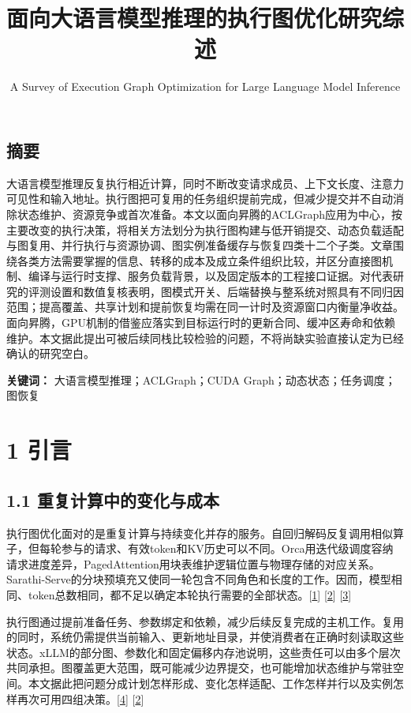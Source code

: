 \documentclass[
  11pt,
  UTF8]{ctexart}
\title{面向大语言模型推理的执行图优化研究综述}
\subtitle{A Survey of Execution Graph Optimization for Large Language
Model Inference}
\author{}
\date{}
\begin{document}
\maketitle

\hypertarget{abstract}{%
\subsection*{摘要}\label{abstract}}

大语言模型推理反复执行相近计算，同时不断改变请求成员、上下文长度、注意力可见性和输入地址。执行图把可复用的任务组织提前完成，但减少提交并不自动消除状态维护、资源竞争或首次准备。本文以面向昇腾的ACLGraph应用为中心，按主要改变的执行决策，将相关方法划分为执行图构建与低开销提交、动态负载适配与图复用、并行执行与资源协调、图实例准备缓存与恢复四类十二个子类。文章围绕各类方法需要掌握的信息、转移的成本及成立条件组织比较，并区分直接图机制、编译与运行时支撑、服务负载背景，以及固定版本的工程接口证据。对代表研究的评测设置和数值复核表明，图模式开关、后端替换与整系统对照具有不同归因范围；提高覆盖、共享计划和提前恢复均需在同一计时及资源窗口内衡量净收益。面向昇腾，GPU机制的借鉴应落实到目标运行时的更新合同、缓冲区寿命和依赖维护。本文据此提出可被后续同栈比较检验的问题，不将尚缺实验直接认定为已经确认的研究空白。

\textbf{关键词：} 大语言模型推理；ACLGraph；CUDA
Graph；动态状态；任务调度；图恢复

\hypertarget{section-1}{%
\section{1 引言}\label{section-1}}

\hypertarget{section-1-1}{%
\subsection{1.1 重复计算中的变化与成本}\label{section-1-1}}

执行图优化面对的是重复计算与持续变化并存的服务。自回归解码反复调用相似算子，但每轮参与的请求、有效token和KV历史可以不同。Orca用迭代级调度容纳请求进度差异，PagedAttention用块表维护逻辑位置与物理存储的对应关系。Sarathi-Serve的分块预填充又使同一轮包含不同角色和长度的工作。因而，模型相同、token总数相同，都不足以确定本轮执行需要的全部状态。{[}\protect\hyperlink{ref-yu2022orca}{1}{]}
{[}\protect\hyperlink{ref-kwon2023vllm}{2}{]}
{[}\protect\hyperlink{ref-agrawal2024sarathi}{3}{]}

执行图通过提前准备任务、参数绑定和依赖，减少后续反复完成的主机工作。复用的同时，系统仍需提供当前输入、更新地址目录，并使消费者在正确时刻读取这些状态。xLLM的部分图、参数化和固定偏移内存池说明，这些责任可以由多个层次共同承担。图覆盖更大范围，既可能减少边界提交，也可能增加状态维护与常驻空间。本文据此把问题分成计划怎样形成、变化怎样适配、工作怎样并行以及实例怎样再次可用四组决策。{[}\protect\hyperlink{ref-liu2025xllm}{4}{]}
{[}\protect\hyperlink{ref-kwon2023vllm}{2}{]}
\end{document}
